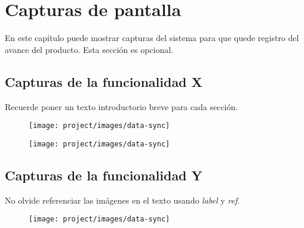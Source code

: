 \chapter{Capturas de pantalla}
En este capítulo puede mostrar capturas del sistema para que quede registro del avance del producto. Esta sección es opcional.
\section{Capturas de la funcionalidad X}
Recuerde poner un texto introductorio breve para cada sección.
\vspace{2cm}
\begin{figure}[H]
  \centering
    \texttt{[image: project/images/data-sync]}
\end{figure}
\newpage
\begin{figure}[H]
  \centering
    \texttt{[image: project/images/data-sync]}
\end{figure}
\vspace{1cm}

\section{Capturas de la funcionalidad Y}
No olvide referenciar las imágenes en el texto usando \emph{label} y \emph{ref}.

\begin{figure}[H]
  \centering
    \texttt{[image: project/images/data-sync]}
\end{figure}